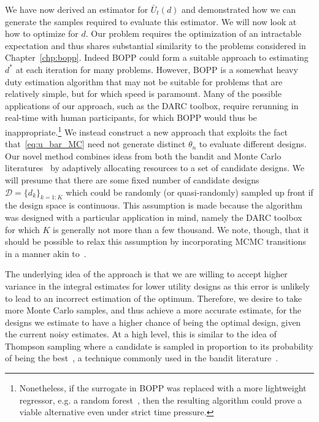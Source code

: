 We have now derived an estimator for $\bar{U}_t(d)$ and demonstrated how we can generate the
samples required to evaluate this estimator.  We will now look at how to optimize for $d$.  
Our problem requires the optimization of an intractable expectation and thus shares substantial
similarity to the problems considered in Chapter~\ref{chp:bopp}.  Indeed BOPP could form a suitable
approach to estimating $d^*$ at each iteration for many problems.  However, BOPP is a somewhat heavy
duty estimation algorithm that may not be suitable for problems that are relatively simple,
but for which speed is paramount.  Many of the possible applications of our approach, such
as the DARC toolbox, require rerunning in real-time with human participants, for which BOPP would
thus be inappropriate.\footnote{Nonetheless, if the surrogate in BOPP
	was replaced with a more lightweight regressor, e.g. a random forest~\cite{hutter2011sequential},
	then the resulting algorithm could prove a viable alternative even under strict time pressure.}
We instead construct a new approach
that exploits the fact that~\eqref{eq:u_bar_MC} need not generate distinct $\theta_n$ to evaluate
different designs.  Our novel method combines ideas from both the bandit and
Monte Carlo literatures~\citep{amzal2006bayesian,neufeld2014adaptive} by adaptively 
allocating resources to a set of candidate designs.  We will presume that there are some fixed number 
of candidate designs $\mathcal{D} = \{d_k\}_{k=1:K}$ which could be randomly (or quasi-randomly)
sampled up front if the design space is continuous.  This assumption is made because the 
algorithm was designed with a particular application in mind, namely the DARC toolbox for which $K$
is generally not more than a few thousand.  We note, though, that it should be possible to relax this
assumption by incorporating MCMC transitions in a manner akin to~\citep{amzal2006bayesian}.

The underlying idea of the approach is that we are willing to accept higher variance in the integral estimates for lower utility designs as this error is unlikely to lead to an incorrect estimation of the optimum.
Therefore, we desire to take more Monte Carlo samples, and thus achieve a more accurate estimate, for the designs we estimate to have a higher chance of being the optimal design, given the current noisy estimates.
At a high level, this is similar  to the idea of Thompson sampling
where a candidate is sampled in proportion to its probability of being the best~\citep{thompson1933likelihood}, 
a technique commonly used in the bandit literature~\citep{agrawal2012analysis}.

